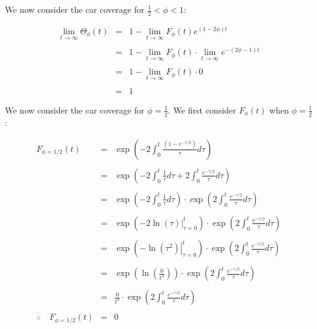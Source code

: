 We now consider the car coverage for $\frac{1}{2} < \phi < 1$: \bigskip

\begin{eqnarray*}
	\lim_{t \to \infty} \Theta_{\phi}(t) & = & 1 - \lim_{t \to \infty} F_{\phi}(t) e^{(1 - 2 \phi)t} \\\\
										 & = & 1 - \lim_{t \to \infty} F_{\phi}(t) \cdot \lim_{t \to \infty} e^{-(2 \phi - 1)t} \\\\
										 & = & 1 - \lim_{t \to \infty} F_{\phi}(t) \cdot 0 \\\\
										 & = & 1 
\end{eqnarray*}\medskip

We now consider the car coverage for $\phi = \frac{1}{2}$. We first consider 
$F_{\phi}(t)$ when $\phi = \frac{1}{2}$: \bigskip

\begin{eqnarray*}
					 F_{\phi = 1/2}(t) & = & \exp \left( -2 \int_{0}^{t} \frac{(1 - e^{-\tau/2})}{\tau} d\tau \right) \\\\
									   & = & \exp \left( -2 \int_{0}^{t} \frac{1}{\tau} d\tau + 2 \int_{0}^{t} \frac{e^{-\tau/2}}{\tau} d\tau \right) \\\\
									   & = & \exp \left( -2 \int_{0}^{t} \frac{1}{\tau} d\tau\right) \cdot \exp \left( 2 \int_{0}^{t} \frac{e^{-\tau/2}}{\tau} d\tau \right) \\\\
									   & = & \exp \left( -2 \left. \ln(\tau) \right|_{\tau = 0}^{t} \right) \cdot \exp \left( 2 \int_{0}^{t} \frac{e^{-\tau/2}}{\tau} d\tau \right) \\\\
									   & = & \exp \left( - \left. \ln(\tau^2) \right|_{\tau = 0}^{t} \right) \cdot \exp \left( 2 \int_{0}^{t} \frac{e^{-\tau/2}}{\tau} d\tau \right) \\\\
									   & = & \exp \left( \ln\left( \frac{0}{t^2} \right) \right) \cdot \exp \left( 2 \int_{0}^{t} \frac{e^{-\tau/2}}{\tau} d\tau \right) \\\\
									   & = & \frac{0}{t^2} \cdot \exp \left( 2 \int_{0}^{t} \frac{e^{-\tau/2}}{\tau} d\tau \right) \\\\
	\therefore \quad F_{\phi = 1/2}(t) & = & 0
\end{eqnarray*}\medskip

